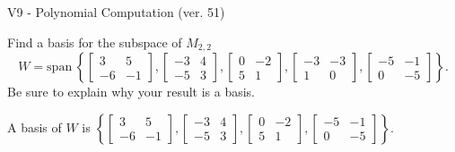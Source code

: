 \begin{exercise}
  \begin{exerciseTitle}V9 - Polynomial Computation (ver. 51)\end{exerciseTitle}
  \begin{exerciseStatement}
    Find a basis for the subspace of \(M_{2,2}\) 
\[W=\mathrm{span}\ \left\{\left[\begin{array}{cc}
3 & 5 \\
-6 & -1
\end{array}\right] , \left[\begin{array}{cc}
-3 & 4 \\
-5 & 3
\end{array}\right] , \left[\begin{array}{cc}
0 & -2 \\
5 & 1
\end{array}\right] , \left[\begin{array}{cc}
-3 & -3 \\
1 & 0
\end{array}\right] , \left[\begin{array}{cc}
-5 & -1 \\
0 & -5
\end{array}\right]\right\}.\]
 Be sure to explain why your result is a basis.


  \end{exerciseStatement}
  \begin{exerciseAnswer}
   A basis of \(W\) is  \(\left\{\left[\begin{array}{cc}
3 & 5 \\
-6 & -1
\end{array}\right] , \left[\begin{array}{cc}
-3 & 4 \\
-5 & 3
\end{array}\right] , \left[\begin{array}{cc}
0 & -2 \\
5 & 1
\end{array}\right] , \left[\begin{array}{cc}
-5 & -1 \\
0 & -5
\end{array}\right]\right\}\).
  


  \end{exerciseAnswer}
\end{exercise}